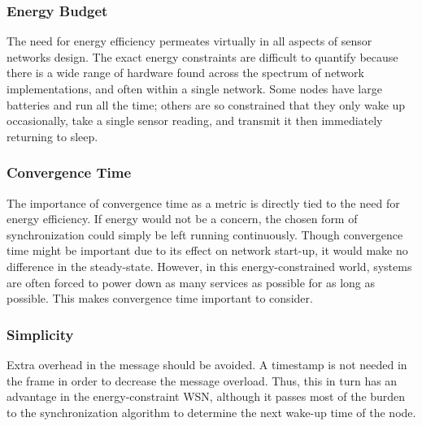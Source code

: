 \documentclass[a4paper,10pt]{report}
\begin{document}
\subsubsection{\textbf{Energy Budget}} The need for energy efficiency permeates virtually in all aspects of sensor networks design. The
exact energy constraints are difficult to quantify because there is a wide range of hardware found across the spectrum of network
implementations, and often within a single network. Some nodes have large batteries and run all the time; others are so constrained that
they only wake up occasionally, take a single sensor reading, and transmit it then immediately returning to sleep.
\subsubsection{\textbf{Convergence Time}} The importance of convergence time as a metric is directly tied to the need for energy efficiency. If energy would not be a concern, the chosen form of synchronization could simply be left running continuously. Though convergence time might be important due to its effect on network start-up, it would make no difference in the steady-state. However, in this energy-constrained world, systems are often forced to power down as many services as possible for as long as possible. This makes
convergence time important to consider.
\subsubsection{\textbf{Simplicity}} Extra overhead in the message should be avoided. A timestamp is not needed in the frame in order to decrease the message overload. Thus, this in turn has an advantage in the energy-constraint WSN, although it passes most of the burden to the synchronization algorithm to determine the next wake-up time of the node.
\end{document}
